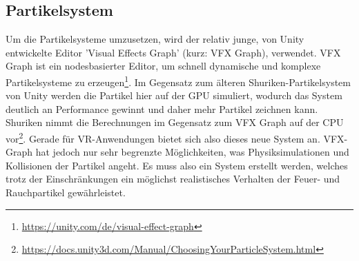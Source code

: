 \subsection{Partikelsystem}
Um die Partikelsysteme umzusetzen, wird der relativ junge, von Unity entwickelte Editor 'Visual Effects Graph'
(kurz: VFX Graph), verwendet. VFX Graph ist ein nodesbasierter Editor, um schnell
dynamische und komplexe Partikelsysteme zu erzeugen\footnote{\url{https://unity.com/de/visual-effect-graph}}.
Im Gegensatz zum älteren Shuriken-Partikelsystem von Unity werden die Partikel hier auf der GPU
simuliert, wodurch das System deutlich an Performance gewinnt und daher mehr Partikel zeichnen kann.
Shuriken nimmt die Berechnungen im Gegensatz zum VFX Graph auf der CPU vor\footnote{\url{https://docs.unity3d.com/Manual/ChoosingYourParticleSystem.html}}.
Gerade für VR-Anwendungen bietet sich also dieses neue System an.
VFX-Graph hat jedoch nur sehr begrenzte Möglichkeiten, was Physiksimulationen und Kollisionen der Partikel angeht.
Es muss also ein System erstellt werden, welches trotz der Einschränkungen ein möglichst realistisches
Verhalten der Feuer- und Rauchpartikel gewährleistet.




\newpage
